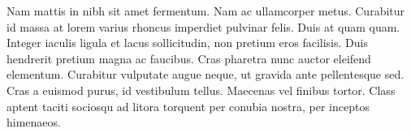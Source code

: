 Nam mattis in nibh sit amet fermentum. Nam ac ullamcorper metus. Curabitur id massa at lorem varius rhoncus imperdiet pulvinar felis. Duis at quam quam. Integer iaculis ligula et lacus sollicitudin, non pretium eros facilisis. Duis hendrerit pretium magna ac faucibus. Cras pharetra nunc auctor eleifend elementum. Curabitur vulputate augue neque, ut gravida ante pellentesque sed. Cras a euismod purus, id vestibulum tellus. Maecenas vel finibus tortor. Class aptent taciti sociosqu ad litora torquent per conubia nostra, per inceptos himenaeos. 
